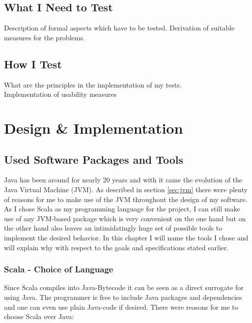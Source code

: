 \documentclass[twoside, 11pt]{scrartcl}
\begin{document}
\subsection{What I Need to Test}
Description of formal aspects which have to be tested. Derivation of suitable measures for the problems.
\subsection{How I Test}
What are the principles in the implementation of my tests.\\
Implementation of usability measures
 

\section{Design \& Implementation}
\label{sec:implementation}
\subsection{Used Software Packages and Tools}
\label{sec:softwarePackages}
Java has been around for nearly 20 years \cite{link:javaRelease1} and with it came the evolution of the Java Virtual Machine (JVM). As described in section \ref{sec:jvm} there were plenty of reasons for me to make use of the JVM throughout the design of my software.
As I chose Scala as my programming language for the project, I can still make use of any JVM-based package which is very convenient on the one hand but on the other hand also leaves an intimidatingly huge set of possible tools to implement the desired behavior. In this chapter I will name the tools I chose and will explain why with respect to the goals and specifications stated earlier.

\subsubsection{Scala - Choice of Language} %
Since Scala compiles into Java-Bytecode it can be seen as a direct surrogate for using Java. The programmer is free to include Java packages and dependencies and one can even use plain Java-code if desired. There were reasons for me to choose Scala over Java:\\
\end{document}
